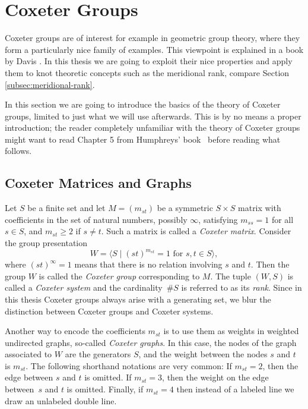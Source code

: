 \documentclass[main.tex]{subfiles}
\begin{document}
\newpage
\section{Coxeter Groups}\label{sec:coxeter-groups}
Coxeter groups are of interest for example in geometric group
theory, where they form a particularly nice family of examples. This viewpoint is explained in a book by Davis
\cite{davis2008}.
In this thesis we are going to exploit their nice properties 
and apply them to knot theoretic concepts such as the 
meridional rank, compare Section \ref{subsec:meridional-rank}.

In this section we are going to introduce the basics of 
the theory of Coxeter groups, limited to just what we will 
use afterwards. This is by no means a proper introduction; 
the reader completely unfamiliar with the theory of 
Coxeter groups might want to read Chapter 5 from 
Humphreys' book~\cite{humphreys1990} before reading 
what follows.

\subsection{Coxeter Matrices and Graphs}
Let $S$ be a finite set and let $M = (m_{st})$ be a symmetric 
$S \times S$ matrix with coefficients in the set of 
natural numbers, possibly $\infty$, satisfying $m_{ss} = 1$ 
for all $s \in S$, and $m_{st} \geq 2$ if $s \ne t$. 
Such a matrix is called a \textit{Coxeter matrix}. 
Consider the group presentation
$$W = 
\langle 
	S \; | \; (st)^{m_{st}} = 1 \text{ for } s,t\in S 
\rangle,$$
where $(st)^\infty = 1$ means that there is no relation involving $s$ and $t$.
Then the group $W$ is called the \textit{Coxeter group}
corresponding to $M$. The tuple $(W,S)$ is called a
\textit{Coxeter system} and the cardinality~$\#S$ is referred
to as its \textit{rank}. Since in this thesis Coxeter groups
always arise with a generating set, we blur the
distinction between Coxeter groups and Coxeter systems.

Another way to encode the coefficients $m_{st}$ is to use
them as weights in weighted undirected graphs, so-called
\textit{Coxeter graphs}. In this case, the nodes of the graph
associated to $W$ are the generators $S$, and the weight
between the nodes $s$ and $t$ is $m_{st}$. The following
shorthand notations are very common: If $m_{st} = 2$, then 
the edge between $s$ and $t$ is omitted. If $m_{st} = 3$, then 
the weight on the edge between~$s$ and $t$ is omitted. 
Finally, if $m_{st} = 4$ then instead of a labeled line we 
draw an unlabeled double line.
\end{document}
